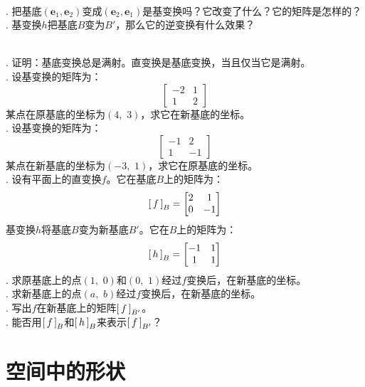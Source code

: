 \documentclass[12pt,UTF8,fontset=none]{ctexbook}
\begin{document}
\begin{sk}
    \mbox{} \\
    . 把基底$(\mathbf{e}_1, \mathbf{e}_2)$变成$(\mathbf{e}_2, \mathbf{e}_1)$是基变换吗？它改变了什么？它的矩阵是怎样的？\\
    . 基变换$h$把基底$B$变为$B'$，那么它的逆变换有什么效果？
\end{sk}

\begin{xt}
    \mbox{} \\
    . 证明：基底变换总是满射。直变换是基底变换，当且仅当它是满射。\\
    . 设基变换的矩阵为：
    $$
    \begin{bmatrix}
        -2 & 1 \\ 1 & 2
    \end{bmatrix}
    $$
    \indent 某点在原基底的坐标为$(4,\,\,3)$，求它在新基底的坐标。\\
    . 设基变换的矩阵为：
    $$
    \begin{bmatrix}
        -1 & 2 \\ 1 & -1
    \end{bmatrix}
    $$
    \indent 某点在新基底的坐标为$(-3,\,\,1)$，求它在原基底的坐标。\\
    . 设有平面上的直变换$f$。它在基底$B$上的矩阵为：
    $$
    \bmat{f}[B] = 
    \begin{bmatrix}
        2 & 1 \\ 0 & -1
    \end{bmatrix}
    $$
    \indent 基变换$h$将基底$B$变为新基底$B'$。它在$B$上的矩阵为：
    $$
    \bmat{h}[B] = 
    \begin{bmatrix}
        -1 & 1 \\ 1 & 1
    \end{bmatrix}
    $$
    . 求原基底上的点$(1,\,\,0)$和$(0,\,\,1)$经过$f$变换后，在新基底的坐标。\\
    . 求新基底上的点$(a,\,\,b)$经过$f$变换后，在新基底的坐标。\\
    . 写出$f$在新基底上的矩阵$\bmat{f}[B']$。\\
    . 能否用$\bmat{f}[B]$和$\bmat{h}[B]$来表示$\bmat{f}[B']$？
\end{xt}

\chapter{空间中的形状}
\end{document}
